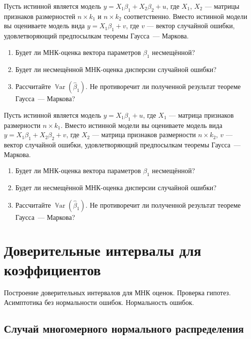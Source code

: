 \documentclass[12pt]{article}
\DeclareMathOperator{\Var}{\mathbb{V}ar}
\renewcommand{\b}{\beta}
\newcommand{\hb}{\hat{\beta}}
\begin{document}
\begin{problem}
Пусть истинной является модель $y = X_1\b_1+ X_2\b_2+u$, где $X_1$, $X_2$  — матрицы признаков размерностей $n \times k_1$ и $n \times k_2$ соответственно. Вместо истинной модели вы оцениваете модель вида $y = X_1\b_1+v$, где $v$ — вектор случайной ошибки, удовлетворяющий предпосылкам теоремы Гаусса~— Маркова.
\begin{enumerate}
    \item Будет ли МНК-оценка вектора параметров $\b_1$ несмещённой?
    \item Будет ли несмещённой МНК-оценка дисперсии случайной ошибки?
    \item Рассчитайте $\Var(\hb_1)$. Не противоречит ли полученной результат теореме Гаусса~— Маркова?
\end{enumerate}
\end{problem}

\begin{problem}
Пусть истинной является модель $y = X_1\b_1+u$, где $X_1$ — матрица признаков размерности $n \times k_1$. Вместо истинной модели вы оцениваете модель вида $y = X_1\b_1+ X_2\b_2+v$, где $X_2$  — матрица признаков размерности  $n \times k_2$, $v$ — вектор случайной ошибки, удовлетворяющий предпосылкам теоремы Гаусса~— Маркова.
\begin{enumerate}
    \item Будет ли МНК-оценка вектора параметров $\b_1$ несмещённой?
    \item Будет ли несмещённой МНК-оценка дисперсии случайной ошибки?
    \item Рассчитайте $\Var(\hb_1)$. Не противоречит ли полученной результат теореме Гаусса~— Маркова?
\end{enumerate}
\end{problem}

\section{Доверительные интервалы для коэффициентов}
Построение доверительных интервалов для МНК оценок. Проверка гипотез. Асимптотика без нормальности ошибок. Нормальность ошибок.


\subsection{Случай многомерного нормального распределения}
\end{document}
